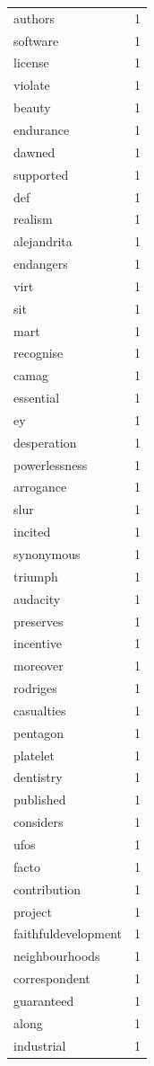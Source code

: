 \begin{tabular}{lr}
authors & 1 \\
software & 1 \\
license & 1 \\
violate & 1 \\
beauty & 1 \\
endurance & 1 \\
dawned & 1 \\
supported & 1 \\
def & 1 \\
realism & 1 \\
alejandrita & 1 \\
endangers & 1 \\
virt & 1 \\
sit & 1 \\
mart & 1 \\
recognise & 1 \\
camag & 1 \\
essential & 1 \\
ey & 1 \\
desperation & 1 \\
powerlessness & 1 \\
arrogance & 1 \\
slur & 1 \\
incited & 1 \\
synonymous & 1 \\
triumph & 1 \\
audacity & 1 \\
preserves & 1 \\
incentive & 1 \\
moreover & 1 \\
rodriges & 1 \\
casualties & 1 \\
pentagon & 1 \\
platelet & 1 \\
dentistry & 1 \\
published & 1 \\
considers & 1 \\
ufos & 1 \\
facto & 1 \\
contribution & 1 \\
project & 1 \\
faithfuldevelopment & 1 \\
neighbourhoods & 1 \\
correspondent & 1 \\
guaranteed & 1 \\
along & 1 \\
industrial & 1 \\

\end{tabular}

